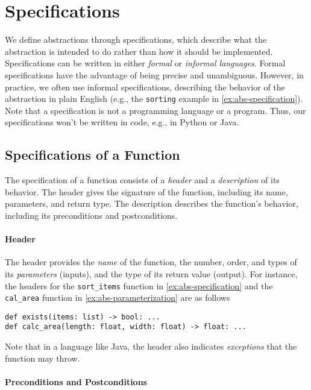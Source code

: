 \documentclass[oneside,11pt,dvipsnames]{book}
\newcommand{\code}[1]{\texttt{#1}}
\begin{document}
\section{Specifications}\label{sec:specifications}

We define abstractions through specifications, which describe what the abstraction is intended to do rather than how it should be implemented.  Specifications can be written in either \emph{formal} or \emph{informal languages}. Formal specifications have the advantage of being precise and unambiguous. However, in practice, we often use informal specifications, describing the behavior of the abstraction in plain English (e.g., the \code{sorting} example in \autoref{ex:abs-specification}).  Note that a specification is not a programming language or a program. Thus, our specifications won’t be written in code, e.g., in Python or Java.

\subsection{Specifications of a Function}\label{sec:spec-function}

The specification of a function consists of a \emph{header} and a \emph{description} of its behavior.
The header gives the signature of the function, including its name, parameters, and return type. The description describes the function's behavior, including its preconditions and postconditions.

\paragraph{Header} The header provides the \emph{name} of the function, the number, order, and types of its \emph{parameters} (inputs), and the type of its return value (output). For instance, the headers for the \code{sort\_items} function in \autoref{ex:abs-specification} and the \code{cal\_area} function in \autoref{ex:abs-parameterization} are as follows

\begin{lstlisting}
def exists(items: list) -> bool: ...
def calc_area(length: float, width: float) -> float: ...
\end{lstlisting}

Note that in a language like Java, the header also indicates \emph{exceptions} that the function may throw.

\paragraph{Preconditions and Postconditions}
\end{document}
